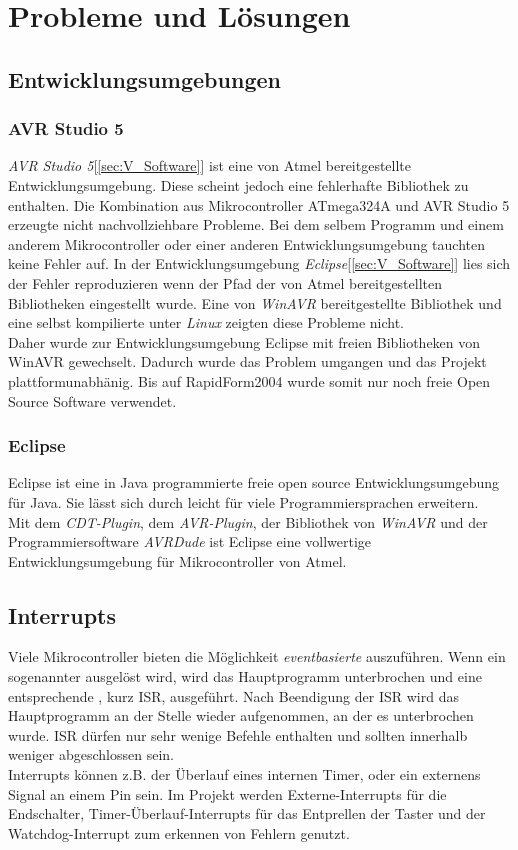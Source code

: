 \chapter{Probleme und Lösungen}
\section{Entwicklungsumgebungen}
\subsection{AVR Studio 5}
\emph{AVR Studio 5}[\ref{sec:V_Software}] ist eine von Atmel bereitgestellte Entwicklungsumgebung. Diese scheint jedoch eine fehlerhafte Bibliothek zu enthalten. Die Kombination aus Mikrocontroller ATmega324A und AVR Studio 5 erzeugte nicht nachvollziehbare Probleme. Bei dem selbem Programm und einem anderem Mikrocontroller oder einer anderen Entwicklungsumgebung tauchten keine Fehler auf.
In der Entwicklungsumgebung \emph{Eclipse}[\ref{sec:V_Software}] lies sich der Fehler reproduzieren wenn der Pfad der von Atmel bereitgestellten Bibliotheken eingestellt wurde. Eine von \emph{WinAVR} bereitgestellte Bibliothek und eine selbst kompilierte  unter \emph{Linux} zeigten diese Probleme nicht.\\
Daher wurde zur  Entwicklungsumgebung Eclipse mit freien Bibliotheken von WinAVR gewechselt. Dadurch wurde das Problem umgangen und das Projekt plattformunabhänig. Bis auf RapidForm2004 wurde somit nur noch freie Open Source Software verwendet.\\
\subsection{Eclipse}
Eclipse ist eine in Java programmierte freie open source Entwicklungsumgebung für Java. Sie lässt sich durch  leicht für viele Programmiersprachen erweitern.\\
Mit dem \emph{CDT-Plugin}, dem \emph{AVR-Plugin}, der Bibliothek von \emph{WinAVR} und der Programmiersoftware \emph{AVRDude} ist Eclipse eine vollwertige Entwicklungsumgebung für Mikrocontroller von Atmel. 

\section{Interrupts}
\label{sec:Interrupts}
Viele Mikrocontroller bieten die Möglichkeit \emph{eventbasierte}  auszuführen. Wenn ein sogenannter  ausgelöst wird, wird das Hauptprogramm unterbrochen und eine entsprechende , kurz ISR, ausgeführt. Nach Beendigung der ISR wird das Hauptprogramm an der Stelle wieder aufgenommen, an der es unterbrochen wurde. ISR dürfen nur sehr wenige Befehle enthalten und sollten innerhalb weniger  abgeschlossen sein.\\
Interrupts können z.B. der Überlauf eines internen Timer, oder ein externens Signal an einem Pin sein. Im Projekt werden Externe-Interrupts für die Endschalter, Timer-Überlauf-Interrupts für das Entprellen der Taster und der Watchdog-Interrupt zum erkennen von Fehlern genutzt. 

